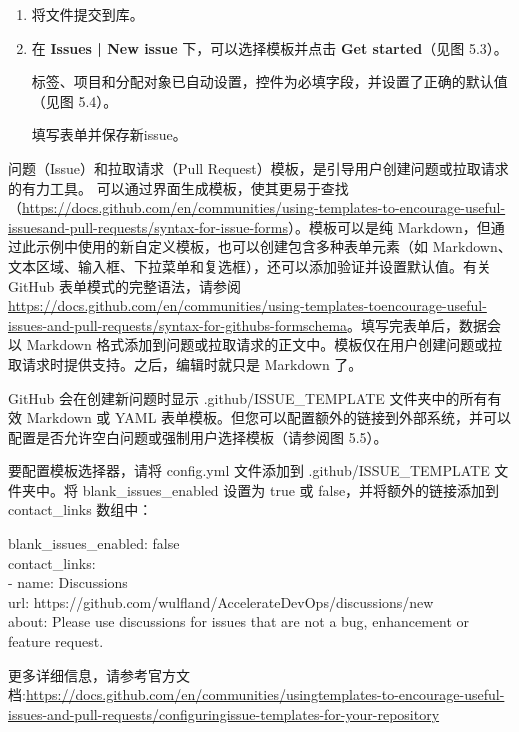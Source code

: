 \begin{enumerate}
\item 
将文件提交到库。

\item 
在 \textbf{Issues | New issue} 下，可以选择模板并点击 \textbf{Get started}（见图 5.3）。


标签、项目和分配对象已自动设置，控件为必填字段，并设置了正确的默认值（见图 5.4）。


填写表单并保存新issue。

\end{enumerate}


问题（Issue）和拉取请求（Pull Request）模板，是引导用户创建问题或拉取请求的有力工具。
可以通过界面生成模板，使其更易于查找（\url{https://docs.github.com/en/communities/using-templates-to-encourage-useful-issuesand-pull-requests/syntax-for-issue-forms}）。模板可以是纯 Markdown，但通过此示例中使用的新自定义模板，也可以创建包含多种表单元素（如 Markdown、文本区域、输入框、下拉菜单和复选框），还可以添加验证并设置默认值。有关 GitHub 表单模式的完整语法，请参阅 \url{https://docs.github.com/en/communities/using-templates-toencourage-useful-issues-and-pull-requests/syntax-for-githubs-formschema}。填写完表单后，数据会以 Markdown 格式添加到问题或拉取请求的正文中。模板仅在用户创建问题或拉取请求时提供支持。之后，编辑时就只是 Markdown 了。


GitHub 会在创建新问题时显示 .github/ISSUE\_TEMPLATE 文件夹中的所有有效 Markdown 或 YAML 表单模板。但您可以配置额外的链接到外部系统，并可以配置是否允许空白问题或强制用户选择模板（请参阅图 5.5）。


要配置模板选择器，请将 config.yml 文件添加到 .github/ISSUE\_TEMPLATE 文件夹中。将 blank\_issues\_enabled 设置为 true 或 false，并将额外的链接添加到 contact\_links 数组中：

\begin{tcolorbox}[ breakable,colback = bashcodebg, colframe= black!50!white]
\scriptsize{
blank\_issues\_enabled: false \\
contact\_links: \\
\hspace*{1em}- name:  Discussions \\
\hspace*{2.2em}url: https://github.com/wulfland/AccelerateDevOps/discussions/new \\
\hspace*{2.2em}about: Please use discussions for issues that are not a bug, enhancement or feature request.
}
\end{tcolorbox}

更多详细信息，请参考官方文档:\url{https://docs.github.com/en/communities/usingtemplates-to-encourage-useful-issues-and-pull-requests/configuringissue-templates-for-your-repository}


